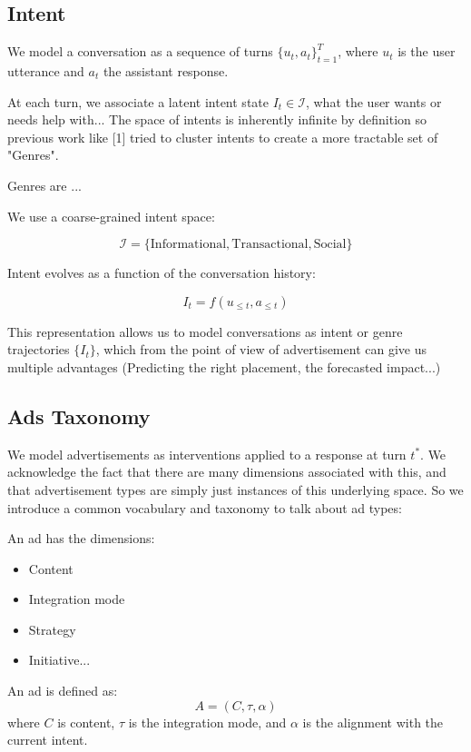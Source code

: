 \documentclass{article}
\begin{document}
\subsection{Intent}

We model a conversation as a sequence of turns $\{u_t, a_t\}_{t=1}^T$, where $u_t$ is the user utterance and $a_t$ the assistant response.

At each turn, we associate a latent intent state $I_t \in \mathcal{I}$, what the user wants or needs help with... The space of intents is inherently infinite by definition so previous work like [1] tried to cluster intents to create a more tractable set of "Genres". 

Genres are ...

We use a coarse-grained intent space:

\[
\mathcal{I} = \{\text{Informational}, \text{Transactional}, \text{Social}\}
\]

Intent evolves as a function of the conversation history:

\[
I_t = f(u_{\leq t}, a_{\leq t})
\]

This representation allows us to model conversations as intent or genre trajectories $\{I_t\}$, which from the point of view of advertisement can give us multiple advantages (Predicting the right placement, the forecasted impact...)

\subsection{Ads Taxonomy}

We model advertisements as interventions applied to a response at turn $t^*$. We acknowledge the fact that there are many dimensions associated with this, and that advertisement types are simply just instances of this underlying space. So we introduce a common vocabulary and taxonomy to talk about ad types:

An ad has the dimensions:
\begin{itemize}
    \item Content
    \item Integration mode 
    \item Strategy
    \item Initiative...
\end{itemize}

An ad is defined as:
\[
A = (C, \tau, \alpha)
\]
where $C$ is content, $\tau$ is the integration mode, and $\alpha$ is the alignment with the current intent.
\end{document}
